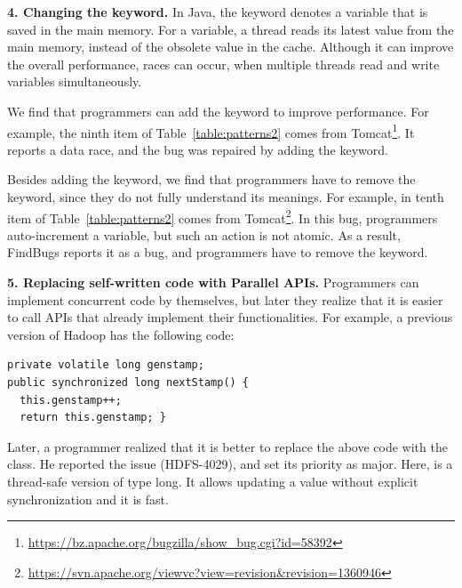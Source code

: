 


\noindent
\textbf{4. Changing the  keyword.} In Java, the  keyword denotes a variable that is saved in the main memory. For a  variable, a thread reads its latest value from the main memory, instead of the obsolete  value in the cache. Although it can improve the overall performance, races can occur, when multiple threads read and write  variables simultaneously.

We find that programmers can add the  keyword to improve performance. For example, the ninth item of Table~\ref{table:patterns2} comes from Tomcat\footnote{\url{https://bz.apache.org/bugzilla/show_bug.cgi?id=58392}}. It reports a data race, and the bug was repaired by adding the  keyword.


Besides adding the keyword, we find that programmers have to remove the  keyword, since they do not fully understand its meanings. For example, in tenth item of Table~\ref{table:patterns2} comes from Tomcat\footnote{\url{https://svn.apache.org/viewvc?view=revision&revision=1360946}}. In this bug, programmers auto-increment a  variable, but such an action is not atomic. As a result, FindBugs reports it as a bug, and programmers have to remove the keyword.

\noindent
\textbf{5. Replacing self-written code with Parallel APIs.} Programmers can implement concurrent code by themselves, but later they realize that it is easier to call APIs that already implement their functionalities. For example, a previous version of Hadoop has the following code:%


\begin{lstlisting}
private volatile long genstamp;
public synchronized long nextStamp() {
  this.genstamp++;
  return this.genstamp; }
\end{lstlisting}

Later, a programmer realized that it is better to replace the above code with the  class. He reported the issue (HDFS-4029), and set its priority as major. Here,  is a thread-safe version of type long. It allows updating a  value without explicit synchronization and it is fast.

